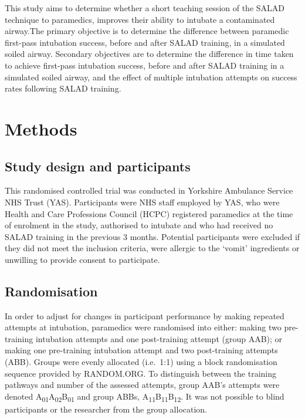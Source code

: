 \documentclass[]{article}
\begin{document}
This study aims to determine whether a short teaching session of the
SALAD technique to paramedics, improves their ability to intubate a
contaminated airway.The primary objective is to determine the difference
between paramedic first-pass intubation success, before and after SALAD
training, in a simulated soiled airway. Secondary objectives are to
determine the difference in time taken to achieve first-pass intubation
success, before and after SALAD training in a simulated soiled airway,
and the effect of multiple intubation attempts on success rates
following SALAD training.

\hypertarget{methods-1}{%
\section{Methods}\label{methods-1}}

\hypertarget{study-design-and-participants}{%
\subsection{Study design and
participants}\label{study-design-and-participants}}

This randomised controlled trial was conducted in Yorkshire Ambulance
Service NHS Trust (YAS). Participants were NHS staff employed by YAS,
who were Health and Care Professions Council (HCPC) registered
paramedics at the time of enrolment in the study, authorised to intubate
and who had received no SALAD training in the previous 3 months.
Potential participants were excluded if they did not meet the inclusion
criteria, were allergic to the `vomit' ingredients or unwilling to
provide consent to participate.

\hypertarget{randomisation}{%
\subsection{Randomisation}\label{randomisation}}

In order to adjust for changes in participant performance by making
repeated attempts at intubation, paramedics were randomised into either:
making two pre-training intubation attempts and one post-training
attempt (group AAB); or making one pre-training intubation attempt and
two post-training attempts (ABB). Groups were evenly allocated
(i.e.~1:1) using a block randomisation sequence provided by RANDOM.ORG.
To distinguish between the training pathways and number of the assessed
attempts, group AAB's attempts were denoted
A\textsubscript{01}A\textsubscript{02}B\textsubscript{01} and group
ABBs, A\textsubscript{11}B\textsubscript{11}B\textsubscript{12}. It was
not possible to blind participants or the researcher from the group
allocation.
\end{document}
